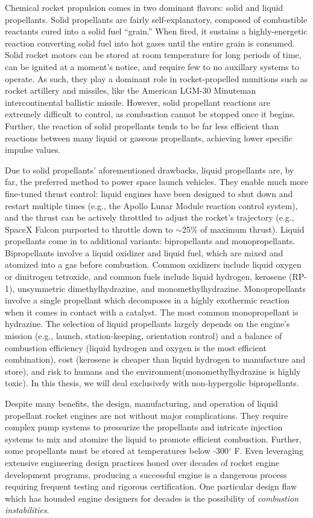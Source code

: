 Chemical rocket propulsion comes in two dominant flavors: solid and liquid propellants. Solid propellants are fairly self-explanatory, composed of combustible reactants cured into a solid fuel ``grain.'' When fired, it sustains a highly-energetic reaction converting solid fuel into hot gases until the entire grain is consumed. Solid rocket motors can be stored at room temperature for long periods of time, can be ignited at a moment's notice, and require few to no auxillary systems to operate. As such, they play a dominant role in rocket-propelled munitions such as rocket artillery and missiles, like the American LGM-30 Minuteman intercontinental ballistic missile. However, solid propellant reactions are extremely difficult to control, as combustion cannot be stopped once it begins. Further, the reaction of solid propellants tends to be far less efficient than reactions between many liquid or gaseous propellants, achieving lower specific impulse values.

Due to solid propellants' aforementioned drawbacks, liquid propellants are, by far, the preferred method to power space launch vehicles. They enable much more fine-tuned thrust control: liquid engines have been designed to shut down and restart multiple times (e.g., the Apollo Lunar Module reaction control system), and the thrust can be actively throttled to adjust the rocket's trajectory (e.g., SpaceX Falcon purported to throttle down to $\sim$25\% of maximum thrust). Liquid propellants come in to additional variants: bipropellants and monopropellants. Bipropellants involve a liquid oxidizer and liquid fuel, which are mixed and atomized into a gas before combustion. Common oxidizers include liquid oxygen or dinitrogen tetroxide, and common fuels include liquid hydrogen, kerosene (RP-1), unsymmetric dimethylhydrazine, and monomethylhydrazine. Monopropellants involve a single propellant which decomposes in a highly exothermic reaction when it comes in contact with a catalyst. The most common monopropellant is hydrazine. The selection of liquid propellants largely depends on the engine's mission (e.g., launch, station-keeping, orientation control) and a balance of combustion efficiency (liquid hydrogen and oxygen is the most efficient combination), cost (kerosene is cheaper than liquid hydrogen to manufacture and store), and risk to humans and the environment(monomethylhydrazine is highly toxic). In this thesis, we will deal exclusively with non-hypergolic bipropellants.

Despite many benefits, the design, manufacturing, and operation of liquid propellant rocket engines are not without major complications. They require complex pump systems to pressurize the propellants and intricate injection systems to mix and atomize the liquid to promote efficient combustion. Further, some propellants must be stored at temperatures below \mbox{-300$^{\circ}$} F. Even leveraging extensive engineering design practices honed over decades of rocket engine development programs, producing a successful engine is a dangerous process requiring frequent testing and rigorous certification. One particular design flaw which has hounded engine designers for decades is the possibility of \textit{combustion instabilities}.


